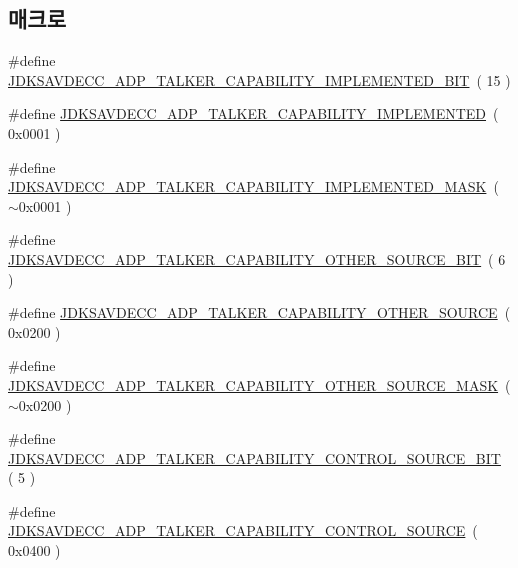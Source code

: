 \subsection*{매크로}
\begin{DoxyCompactItemize}
\item 
\#define \hyperlink{group__talker__capability_ga219c549c02b5480e19d1e7875762a820}{J\+D\+K\+S\+A\+V\+D\+E\+C\+C\+\_\+\+A\+D\+P\+\_\+\+T\+A\+L\+K\+E\+R\+\_\+\+C\+A\+P\+A\+B\+I\+L\+I\+T\+Y\+\_\+\+I\+M\+P\+L\+E\+M\+E\+N\+T\+E\+D\+\_\+\+B\+IT}~( 15 )
\item 
\#define \hyperlink{group__talker__capability_ga9776f9e7ce43fb45783afc9ffcb620a4}{J\+D\+K\+S\+A\+V\+D\+E\+C\+C\+\_\+\+A\+D\+P\+\_\+\+T\+A\+L\+K\+E\+R\+\_\+\+C\+A\+P\+A\+B\+I\+L\+I\+T\+Y\+\_\+\+I\+M\+P\+L\+E\+M\+E\+N\+T\+ED}~( 0x0001 )
\item 
\#define \hyperlink{group__talker__capability_ga618b91689854bb9e3d0938ca62a945a1}{J\+D\+K\+S\+A\+V\+D\+E\+C\+C\+\_\+\+A\+D\+P\+\_\+\+T\+A\+L\+K\+E\+R\+\_\+\+C\+A\+P\+A\+B\+I\+L\+I\+T\+Y\+\_\+\+I\+M\+P\+L\+E\+M\+E\+N\+T\+E\+D\+\_\+\+M\+A\+SK}~( $\sim$0x0001 )
\item 
\#define \hyperlink{group__talker__capability_gab18af5e384f758ddd94aa60b1035a518}{J\+D\+K\+S\+A\+V\+D\+E\+C\+C\+\_\+\+A\+D\+P\+\_\+\+T\+A\+L\+K\+E\+R\+\_\+\+C\+A\+P\+A\+B\+I\+L\+I\+T\+Y\+\_\+\+O\+T\+H\+E\+R\+\_\+\+S\+O\+U\+R\+C\+E\+\_\+\+B\+IT}~( 6 )
\item 
\#define \hyperlink{group__talker__capability_ga849b7ed9c584a6500cc7f46fe2e7ba30}{J\+D\+K\+S\+A\+V\+D\+E\+C\+C\+\_\+\+A\+D\+P\+\_\+\+T\+A\+L\+K\+E\+R\+\_\+\+C\+A\+P\+A\+B\+I\+L\+I\+T\+Y\+\_\+\+O\+T\+H\+E\+R\+\_\+\+S\+O\+U\+R\+CE}~( 0x0200 )
\item 
\#define \hyperlink{group__talker__capability_ga8fc20d2fd8109b54081645f630663898}{J\+D\+K\+S\+A\+V\+D\+E\+C\+C\+\_\+\+A\+D\+P\+\_\+\+T\+A\+L\+K\+E\+R\+\_\+\+C\+A\+P\+A\+B\+I\+L\+I\+T\+Y\+\_\+\+O\+T\+H\+E\+R\+\_\+\+S\+O\+U\+R\+C\+E\+\_\+\+M\+A\+SK}~( $\sim$0x0200 )
\item 
\#define \hyperlink{group__talker__capability_ga0992dbb733e6fa05eeceaa48421ae754}{J\+D\+K\+S\+A\+V\+D\+E\+C\+C\+\_\+\+A\+D\+P\+\_\+\+T\+A\+L\+K\+E\+R\+\_\+\+C\+A\+P\+A\+B\+I\+L\+I\+T\+Y\+\_\+\+C\+O\+N\+T\+R\+O\+L\+\_\+\+S\+O\+U\+R\+C\+E\+\_\+\+B\+IT}~( 5 )
\item 
\#define \hyperlink{group__talker__capability_gacd3c6b996d5c09cc188881595585a8d8}{J\+D\+K\+S\+A\+V\+D\+E\+C\+C\+\_\+\+A\+D\+P\+\_\+\+T\+A\+L\+K\+E\+R\+\_\+\+C\+A\+P\+A\+B\+I\+L\+I\+T\+Y\+\_\+\+C\+O\+N\+T\+R\+O\+L\+\_\+\+S\+O\+U\+R\+CE}~( 0x0400 )

\end{DoxyCompactItemize}
